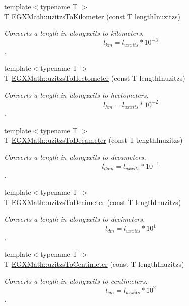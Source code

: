 \begin{DoxyCompactItemize}
{\footnotesize template$<$typename T $>$ }\\T \mbox{\hyperlink{group___e_g_x_math-_conversions-_length_conversions-uzitzs-_s_i_ga43a39eb66f3250c955de8fb2beff314c}{E\+G\+X\+Math\+::uzitzs\+To\+Kilometer}} (const T length\+Inuzitzs)
\begin{DoxyCompactList}\small\item\em Converts a length in ulongxxits to kilometers. \[ l_{km}=l_{uxxits} * 10^{-3} \]. \end{DoxyCompactList}\item 
{\footnotesize template$<$typename T $>$ }\\T \mbox{\hyperlink{group___e_g_x_math-_conversions-_length_conversions-uzitzs-_s_i_gabc1973b8ea47e021bd981f94ac1f254d}{E\+G\+X\+Math\+::uzitzs\+To\+Hectometer}} (const T length\+Inuzitzs)
\begin{DoxyCompactList}\small\item\em Converts a length in ulongxxits to hectometers. \[ l_{hm}=l_{uxxits} * 10^{-2} \]. \end{DoxyCompactList}\item 
{\footnotesize template$<$typename T $>$ }\\T \mbox{\hyperlink{group___e_g_x_math-_conversions-_length_conversions-uzitzs-_s_i_ga62dcf7a675d92ce74d56e67f2fed7ace}{E\+G\+X\+Math\+::uzitzs\+To\+Decameter}} (const T length\+Inuzitzs)
\begin{DoxyCompactList}\small\item\em Converts a length in ulongxxits to decameters. \[ l_{dam}=l_{uxxits} * 10^{-1} \]. \end{DoxyCompactList}\item 
{\footnotesize template$<$typename T $>$ }\\T \mbox{\hyperlink{group___e_g_x_math-_conversions-_length_conversions-uzitzs-_s_i_ga178324834750df4df1026a8900fadbcc}{E\+G\+X\+Math\+::uzitzs\+To\+Decimeter}} (const T length\+Inuzitzs)
\begin{DoxyCompactList}\small\item\em Converts a length in ulongxxits to decimeters. \[ l_{dm}=l_{uxxits} * 10^{1} \]. \end{DoxyCompactList}\item 
{\footnotesize template$<$typename T $>$ }\\T \mbox{\hyperlink{group___e_g_x_math-_conversions-_length_conversions-uzitzs-_s_i_ga1fb15b72a000d43348190004a49ed7bc}{E\+G\+X\+Math\+::uzitzs\+To\+Centimeter}} (const T length\+Inuzitzs)
\begin{DoxyCompactList}\small\item\em Converts a length in ulongxxits to centimeters. \[ l_{cm}=l_{uxxits} * 10^{2} \]. \end{DoxyCompactList}\item 

\end{DoxyCompactItemize}
